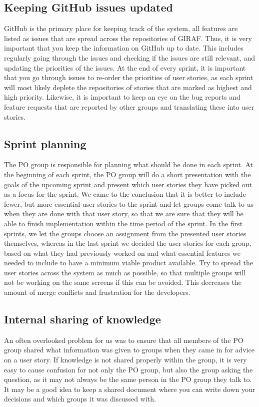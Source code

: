 \subsection{Keeping GitHub issues updated}
GitHub is the primary place for keeping track of the system, all features are listed as issues that are spread across the repositories of GIRAF.
Thus, it is very important that you keep the information on GitHub up to date.
This includes regularly going through the issues and checking if the issues are still relevant, and updating the priorities of the issues. 
At the end of every sprint, it is important that you go through issues to re-order the priorities of user stories, as each sprint will most likely deplete the repositories of stories that are marked as highest and high priority.
Likewise, it is important to keep an eye on the bug reports and feature requests that are reported by other groups and translating these into user stories.

\subsection{Sprint planning}
The PO group is responsible for planning what should be done in each sprint.
At the beginning of each sprint, the PO group will do a short presentation with the goals of the upcoming sprint and present which user stories they have picked out as a focus for the sprint.
We came to the conclusion that it is better to include fewer, but more essential user stories to the sprint and let groups come talk to us when they are done with that user story, so that we are sure that they will be able to finish implementation within the time period of the sprint.
In the first sprints, we let the groups choose an assignment from the presented user stories themselves, whereas in the last sprint we decided the user stories for each group, based on what they had previously worked on and what essential features we needed to include to have a minimum viable product available.
Try to spread the user stories across the system as much as possible, so that multiple groups will not be working on the same screens if this can be avoided.
This decreases the amount of merge conflicts and frustration for the developers.

\subsection{Internal sharing of knowledge}
An often overlooked problem for us was to ensure that all members of the PO group shared what information was given to groups when they came in for advice on a user story.
If knowledge is not shared properly within the group, it is very easy to cause confusion for not only the PO group, but also the group asking the question, as it may not always be the same person in the PO group they talk to.
It may be a good idea to keep a shared document where you can write down your decisions and which groups it was discussed with.
